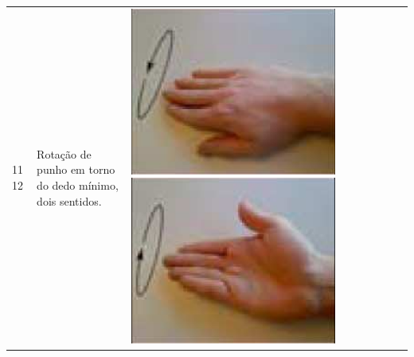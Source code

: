 \begin{table}[htb]
\begin{tabular}{m{0.5cm} m{1.5cm} m{2cm} | m{0.5cm} m{1.5cm} m{2cm} | m{0.5cm} m{1.5cm} m{2cm}}
		11 12	&	Rotação de punho em torno do dedo mínimo, dois sentidos.	& \includegraphics[width=\linewidth]{./img/moves/mov11.png} \includegraphics[width=\linewidth]{./img/moves/mov12.png} &

\end{tabular}
\end{table}
